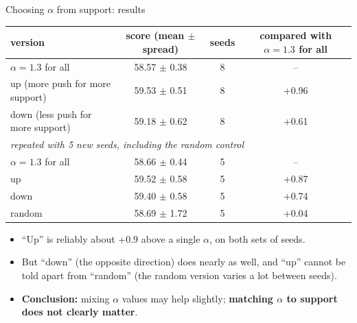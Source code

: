 \documentclass[aspectratio=169,10pt]{beamer}
\begin{document}
\begin{frame}[shrink=8]{Choosing $\alpha$ from support: results}
\centering
\begin{tabular}{lccc}
\toprule
version & score (mean $\pm$ spread) & seeds & compared with $\alpha = 1.3$ for all\\
\midrule
$\alpha = 1.3$ for all & 58.57 $\pm$ 0.38 & 8 & --\\
up (more push for more support) & 59.53 $\pm$ 0.51 & 8 & +0.96\\
down (less push for more support) & 59.18 $\pm$ 0.62 & 8 & +0.61\\
\midrule
\multicolumn{4}{l}{\emph{repeated with 5 new seeds, including the random control}}\\
$\alpha = 1.3$ for all & 58.66 $\pm$ 0.44 & 5 & --\\
up & 59.52 $\pm$ 0.58 & 5 & +0.87\\
down & 59.40 $\pm$ 0.58 & 5 & +0.74\\
random & 58.69 $\pm$ 1.72 & 5 & +0.04\\
\bottomrule
\end{tabular}
\vspace{0.6em}

\raggedright
\begin{itemize}
\item ``Up'' is reliably about +0.9 above a single $\alpha$, on both sets of seeds.
\item But ``down'' (the opposite direction) does nearly as well, and ``up'' cannot be told apart from ``random'' (the random version varies a lot between seeds).
\item \textbf{Conclusion:} mixing $\alpha$ values may help slightly; \textbf{matching $\alpha$ to support does not clearly matter}.
\end{itemize}
\end{frame}

\end{document}
